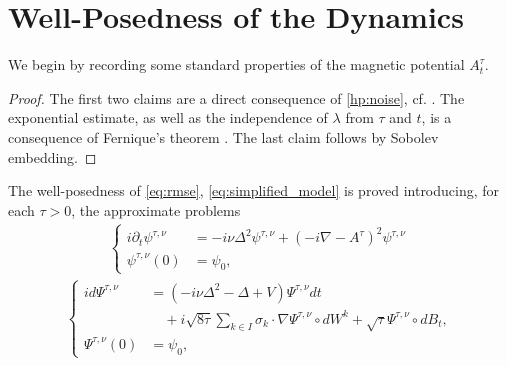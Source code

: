 \documentclass[a4paper,10pt]{amsart}
\newcommand{\R}{\mathbb{R}}
\newcommand{\expt}[1]{\mathbb{E}\left[#1\right]}
\newtheorem{lemma}[theorem]{Lemma}
\theoremstyle{remark}
\numberwithin{equation}{section}
\begin{document}
\section{Well-Posedness of the Dynamics}\label{app:well-posed}
We begin by recording some standard properties of the magnetic potential $A^{\tau}_t$.
\begin{proof}
The first two claims are a direct consequence of \cref{hp:noise}, cf. \cite[Chapter 5]{da2014stochastic}.
    The exponential estimate, as well as the independence of $\lambda$ from
    $\tau$ and $t$, is a consequence of Fernique's theorem
    \cite[Theorem 2.7]{da2014stochastic}.
    The last claim follows by Sobolev embedding.
\end{proof}
The well-posedness of \eqref{eq:rmse}, \eqref{eq:simplified_model} is proved introducing, for each $\tau>0$, the approximate problems
\begin{align}
    \begin{cases}\label{eq:rmse_viscous}
         i\partial_t \psi^{\tau,\nu}&=-i\nu \Delta^2 \psi^{\tau,\nu}+(-i\nabla- A^{\tau} )^2\psi^{\tau,\nu}\\
         \psi^{\tau,\nu}(0)&=\psi_0,
    \end{cases}
\end{align}
\begin{align}
\begin{cases}\label{eq:effectivese_viscous}
        i d\Psi^{\tau,\nu}
        &=(-i\nu \Delta^2-\Delta+V)\Psi^{\tau,\nu}dt\\
        &\quad+i\sqrt{8\tau}\sum_{k\in I}
        \sigma_k\cdot\nabla \Psi^{\tau,\nu}\circ dW^k
        +\sqrt{\tau} \Psi^{\tau,\nu}\circ dB_t,\\
         \Psi^{\tau,\nu}(0)&=\psi_0,
    \end{cases}
\end{align}
\end{document}
